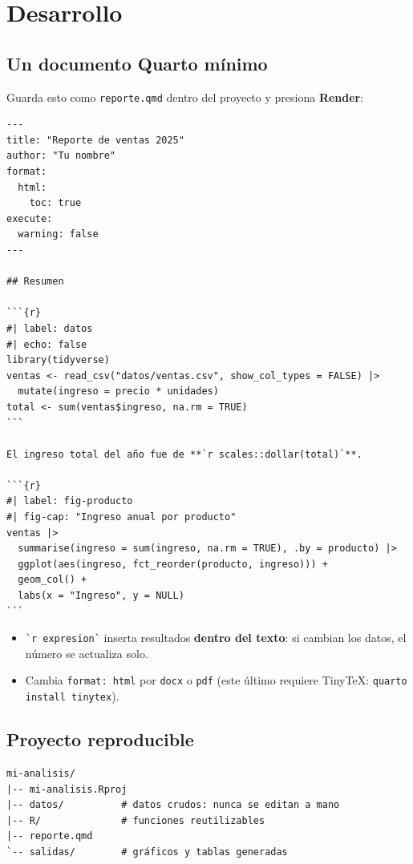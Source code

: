 \section{Desarrollo}

\subsection{Un documento Quarto mínimo}

Guarda esto como \passthrough{\lstinline!reporte.qmd!} dentro del
proyecto y presiona \textbf{Render}:

\begin{lstlisting}
---
title: "Reporte de ventas 2025"
author: "Tu nombre"
format:
  html:
    toc: true
execute:
  warning: false
---

## Resumen

```{r}
#| label: datos
#| echo: false
library(tidyverse)
ventas <- read_csv("datos/ventas.csv", show_col_types = FALSE) |>
  mutate(ingreso = precio * unidades)
total <- sum(ventas$ingreso, na.rm = TRUE)
```

El ingreso total del año fue de **`r scales::dollar(total)`**.

```{r}
#| label: fig-producto
#| fig-cap: "Ingreso anual por producto"
ventas |>
  summarise(ingreso = sum(ingreso, na.rm = TRUE), .by = producto) |>
  ggplot(aes(ingreso, fct_reorder(producto, ingreso))) +
  geom_col() +
  labs(x = "Ingreso", y = NULL)
```
\end{lstlisting}

\begin{itemize}
\tightlist
\item
  \passthrough{\lstinline!`r expresion`!} inserta resultados
  \textbf{dentro del texto}: si cambian los datos, el número se
  actualiza solo.
\item
  Cambia \passthrough{\lstinline!format: html!} por
  \passthrough{\lstinline!docx!} o \passthrough{\lstinline!pdf!} (este
  último requiere TinyTeX:
  \passthrough{\lstinline!quarto install tinytex!}).
\end{itemize}

\subsection{Proyecto reproducible}

\begin{lstlisting}
mi-analisis/
|-- mi-analisis.Rproj
|-- datos/          # datos crudos: nunca se editan a mano
|-- R/              # funciones reutilizables
|-- reporte.qmd
`-- salidas/        # gráficos y tablas generadas
\end{lstlisting}

